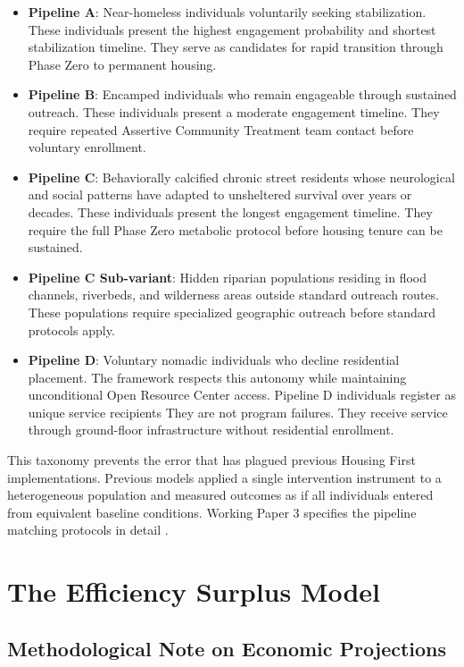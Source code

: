 \documentclass[12pt, letterpaper]{article}
\begin{document}
\begin{itemize}
    \item \textbf{Pipeline A}: Near-homeless individuals voluntarily seeking stabilization. These individuals present the highest engagement probability and shortest stabilization timeline. They serve as candidates for rapid transition through Phase Zero to permanent housing.
    \item \textbf{Pipeline B}: Encamped individuals who remain engageable through sustained outreach. These individuals present a moderate engagement timeline. They require repeated Assertive Community Treatment team contact before voluntary enrollment.
    \item \textbf{Pipeline C}: Behaviorally calcified chronic street residents whose neurological and social patterns have adapted to unsheltered survival over years or decades. These individuals present the longest engagement timeline. They require the full Phase Zero metabolic protocol before housing tenure can be sustained.
    \item \textbf{Pipeline C Sub-variant}: Hidden riparian populations residing in flood channels, riverbeds, and wilderness areas outside standard outreach routes. These populations require specialized geographic outreach before standard protocols apply.
    \item \textbf{Pipeline D}: Voluntary nomadic individuals who decline residential placement. The framework respects this autonomy while maintaining unconditional Open Resource Center access. Pipeline D individuals register as unique service recipients They are not program failures. They receive service through ground-floor infrastructure without residential enrollment.
\end{itemize}

This taxonomy prevents the error that has plagued previous Housing First implementations. Previous models applied a single intervention instrument to a heterogeneous population and measured outcomes as if all individuals entered from equivalent baseline conditions. Working Paper 3 specifies the pipeline matching protocols in detail \citep{dibella_2026_wp3}.

\newpage
\section{The Efficiency Surplus Model}

\subsection{Methodological Note on Economic Projections}
\end{document}
